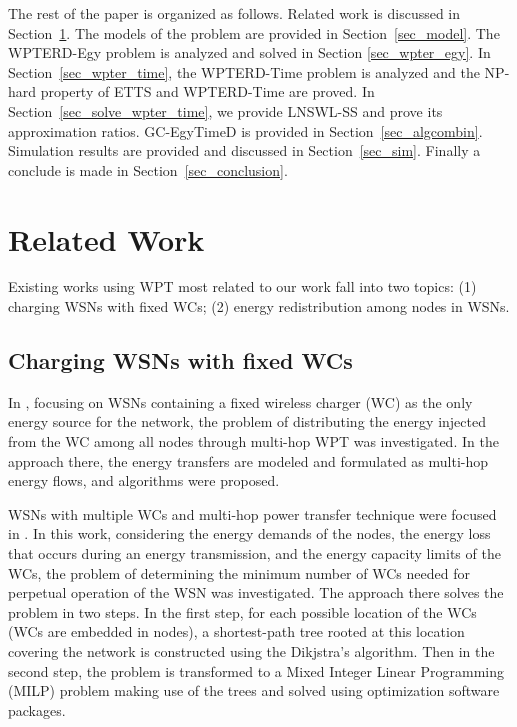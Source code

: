 \documentclass[journal,10pt]{IEEEtran}
\begin{document}
The rest of the paper is organized as follows. Related work is discussed in Section~\ref{sec_relwork}. The models of the problem are provided in Section~\ref{sec_model}. The WPTERD-Egy problem is analyzed and solved in Section \ref{sec_wpter_egy}. In Section~\ref{sec_wpter_time}, the WPTERD-Time problem is analyzed and the NP-hard property of ETTS and WPTERD-Time are proved. In Section~\ref{sec_solve_wpter_time}, we provide LNSWL-SS and prove its approximation ratios. GC-EgyTimeD is provided in Section~\ref{sec_algcombin}. Simulation results are provided and discussed in Section~\ref{sec_sim}. Finally a conclude is made in Section~\ref{sec_conclusion}.

\section{Related Work}
\label{sec_relwork}
Existing works using WPT most related to our work fall into two topics: (1) charging WSNs with fixed WCs; (2) energy redistribution among nodes in WSNs.

\subsection{Charging WSNs with fixed WCs}

In \cite{Xiang2013}, focusing on WSNs containing a fixed wireless charger (WC) as the only energy source for the network, the problem of distributing the energy injected from the WC among all nodes through multi-hop WPT was investigated. In the approach there, the energy transfers are modeled and formulated as multi-hop energy flows, and algorithms were proposed.

WSNs with multiple WCs and multi-hop power transfer technique were focused in \cite{Rault2013}. In this work, considering the energy demands of the nodes, the energy loss that occurs during an energy transmission, and the energy capacity limits of the WCs, the problem of determining the minimum number of WCs needed for perpetual operation of the WSN was investigated. The approach there solves the problem in two steps. In the first step, for each possible location of the WCs (WCs are embedded in nodes), a shortest-path tree rooted at this location covering the network is constructed using the Dikjstra's algorithm. Then in the second step, the problem is transformed to a Mixed Integer Linear Programming (MILP) problem making use of the trees and solved using optimization software packages.
\end{document}
